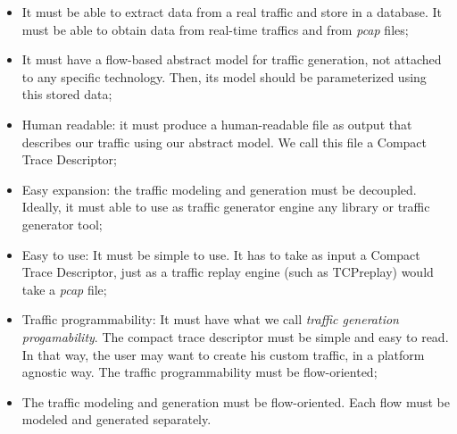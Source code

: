 \begin{itemize}
	
	\item It must be able to extract data from a real traffic and store in a database. It must be able to obtain data from real-time traffics and from \textit{pcap} files;
	
	\item It must have a flow-based abstract model for traffic generation, not attached to any specific technology. Then, its model should be parameterized using this stored data;
	
	\item Human readable: it must produce a human-readable file as output that describes our traffic using our abstract model. We call this file a Compact Trace Descriptor;
	
	\item Easy expansion: the traffic modeling and generation must be decoupled. Ideally, it must able to use as traffic generator engine any library or traffic generator tool;
	
	\item Easy to use: It must be simple to use. It has to take as input a Compact Trace Descriptor, just as a traffic replay engine (such as TCPreplay) would take a \textit{pcap} file;
	
	\item Traffic programmability: It must have what we call \textit{traffic generation progamability}. The compact trace descriptor must be simple and easy to read. In that way, the user may want to create his custom traffic, in a platform agnostic way. The traffic programmability must be flow-oriented;
	
	\item The traffic modeling and generation must be flow-oriented. Each flow must be modeled and generated separately.
	
\end{itemize}



